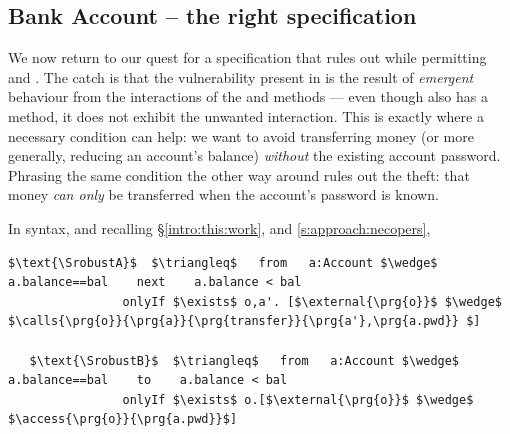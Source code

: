  \subsection{Bank Account -- the right specification}
\label{s:bankSpecEx}

We now {return to our quest for} a specification that rules out \ModB while permitting \ModA and
\ModC. The catch is that the vulnerability present in \ModB is the result
of  \emph{emergent} behaviour from the interactions of the 
and  methods --- even though \ModC also has a
 method, it does not exhibit the unwanted interaction.
This is exactly where a necessary condition can help:
we want to avoid transferring money
(or more generally, reducing an account's balance)
\textit{without} the existing account password.  Phrasing the same condition
the other way around %
rules out the theft: that money \textit{can only} be
transferred when the account's password is known.


In \Nec  syntax, and {recalling \S \ref{intro:this:work}, and \ref{s:approach:necopers},}
 

%
%
%
%
%
%
\begin{lstlisting}[language = Chainmail, mathescape=true, frame=lines]
   $\text{\SrobustA}$  $\triangleq$   from   a:Account $\wedge$ a.balance==bal    next    a.balance < bal
                onlyIf $\exists$ o,a'. [$\external{\prg{o}}$ $\wedge$ $\calls{\prg{o}}{\prg{a}}{\prg{transfer}}{\prg{a'},\prg{a.pwd}} $]    
                
   $\text{\SrobustB}$  $\triangleq$   from   a:Account $\wedge$ a.balance==bal    to    a.balance < bal
                onlyIf $\exists$ o.[$\external{\prg{o}}$ $\wedge$ $\access{\prg{o}}{\prg{a.pwd}}$]    
           
\end{lstlisting}
%
%
% 

